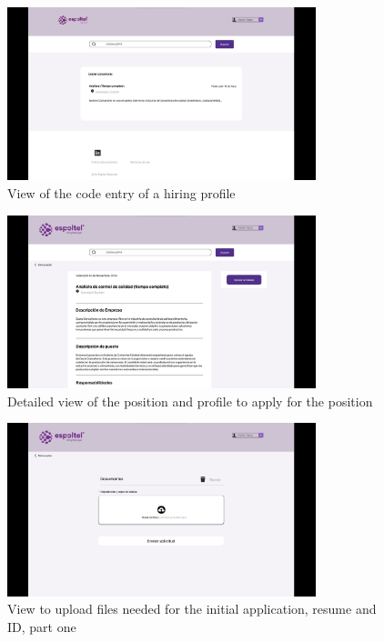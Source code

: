 \documentclass{scrreprt}
\begin{document}
\begin{figure}[H]
	\centering \small
	\includegraphics[width=0.8\textwidth]{WebPrototype/wflow-45.jpeg}
	\caption{View of the code entry of a hiring profile}
\end{figure}

\begin{figure}[H]
	\centering \small
	\includegraphics[width=0.8\textwidth]{WebPrototype/wflow-46.jpeg}
	\caption{Detailed view of the position and profile to apply for the position}
\end{figure}

\begin{figure}[H]
	\centering \small
	\includegraphics[width=0.8\textwidth]{WebPrototype/wflow-47.jpeg}
	\caption{View to upload files needed for the initial application, resume and ID, part one}
\end{figure}
\end{document}
